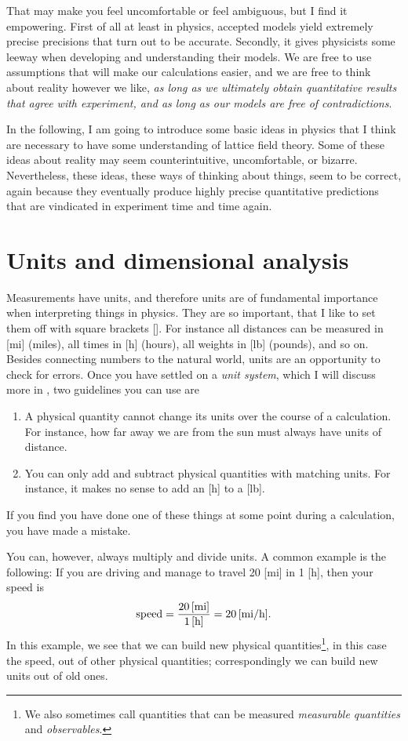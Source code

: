 That may make you feel uncomfortable or feel ambiguous, but I find it
empowering. First of all at least in physics, accepted models yield extremely
precise precisions that turn out to be accurate. Secondly, it gives physicists
some leeway when developing and understanding their models. We are free
to use assumptions that will make our calculations easier, and we are free to
think about reality however we like, {\it as long as we ultimately obtain quantitative
results that agree with experiment, and as long as our models are free of
contradictions}.

In the following, I am going to introduce some basic ideas in physics that I
think are necessary to have some understanding of lattice field theory.
Some of these ideas about reality may seem
counterintuitive, uncomfortable, or bizarre. Nevertheless, these ideas, these
ways of thinking about things, seem to be correct, again because they eventually
produce highly precise quantitative predictions that are vindicated in
experiment time and time again. 


\section{Units and dimensional analysis}


Measurements have units, and therefore units are of fundamental importance when 
interpreting things in physics. They are so important, that I like to set them off 
with square brackets []. For instance all distances can be measured in [mi] (miles), 
all times in [h] (hours), all weights in [lb] (pounds), and so on. 
Besides connecting numbers to the natural world, units are an opportunity to
check for errors. Once you have settled on a {\it unit system}, which I will
discuss more in , two guidelines you can use are
\begin{enumerate}
  \item A physical quantity cannot change its units over the course of a
        calculation. For instance, how far away we are from the sun must always
        have units of distance.
  \item You can only add and subtract physical quantities with matching units.
        For instance, it makes no sense to add an [h] to a [lb].
\end{enumerate}
If you find you have done one of these things at some point during a
calculation, you have made a mistake.

You can, however, always multiply and divide units. A common example is the 
following: If you are driving and manage to travel 20 [mi] in 1 [h], then your speed is
\begin{equation}
\text{speed}=\frac{20\,[\text{mi}]}{1\,[\text{h}]}=20\,[\text{mi/h}].
\end{equation}
In this example, we see that we can build new physical quantities\footnote{We
also sometimes call quantities that can be measured {\it measurable quantities} 
and {\it observables}.}, in this case the speed, out of other physical quantities; 
correspondingly we can build new units out of old ones. 

